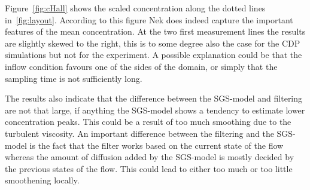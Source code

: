 Figure~\ref{fig:cHall} shows the scaled concentration along the dotted lines in~\ref{fig:layout}. 
According to this figure Nek does indeed capture the important features of the mean concentration.
At the two first measurement lines the results are slightly skewed to the right, this is to some degree 
also the case for the CDP simulations but not for the experiment. A possible explanation could be that 
the inflow condition favours one of the sides of the domain, or simply that the sampling time is not 
sufficiently long. 

The results also indicate that the difference between the SGS-model and filtering are not that large,
if anything the SGS-model shows a tendency to estimate lower concentration peaks. This could be a 
result of too much smoothing due to the turbulent viscosity. An important difference between the 
filtering and the SGS-model is the fact that the filter works based on the current state of the flow 
whereas the amount of diffusion added by the SGS-model is mostly decided by the previous states of the 
flow. This could lead to either too much or too little smoothening locally.

